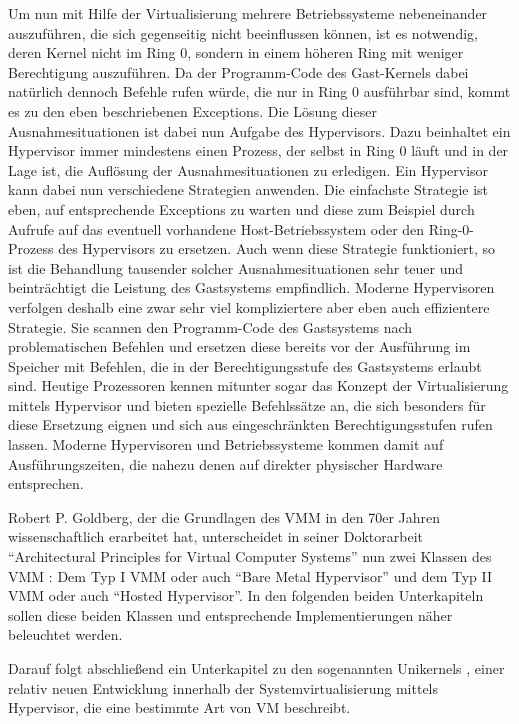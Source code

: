 Um nun mit Hilfe der Virtualisierung mehrere Betriebssysteme nebeneinander auszuführen, die sich gegenseitig nicht beeinflussen können, ist es notwendig, deren Kernel nicht im Ring 0, sondern in einem höheren Ring mit weniger Berechtigung auszuführen. Da der Programm-Code des Gast-Kernels dabei natürlich dennoch Befehle rufen würde, die nur in Ring 0 ausführbar sind, kommt es zu den eben beschriebenen Exceptions. Die Lösung dieser Ausnahmesituationen ist dabei nun Aufgabe des Hypervisors. Dazu beinhaltet ein Hypervisor immer mindestens einen Prozess, der selbst in Ring 0 läuft und in der Lage ist, die Auflösung der Ausnahmesituationen zu erledigen. Ein Hypervisor kann dabei nun verschiedene Strategien anwenden. Die einfachste Strategie ist eben, auf entsprechende Exceptions zu warten und diese zum Beispiel durch Aufrufe auf das eventuell vorhandene Host-Betriebssystem oder den Ring-0-Prozess des Hypervisors zu ersetzen. Auch wenn diese Strategie funktioniert, so ist die Behandlung tausender solcher Ausnahmesituationen sehr teuer und beinträchtigt die Leistung des Gastsystems empfindlich. Moderne Hypervisoren verfolgen deshalb eine zwar sehr viel kompliziertere aber eben auch effizientere Strategie. Sie scannen den Programm-Code des Gastsystems nach problematischen Befehlen und ersetzen diese bereits vor der Ausführung im Speicher mit Befehlen, die in der Berechtigungsstufe des Gastsystems erlaubt sind. Heutige Prozessoren kennen mitunter sogar das Konzept der Virtualisierung mittels Hypervisor und bieten spezielle Befehlssätze an, die sich besonders für diese Ersetzung eignen und sich aus eingeschränkten Berechtigungsstufen rufen lassen. Moderne Hypervisoren und Betriebssysteme kommen damit auf Ausführungszeiten, die nahezu denen auf direkter physischer Hardware entsprechen.

Robert P. Goldberg, der die Grundlagen des \ac{VMM} in den 70er Jahren wissenschaftlich erarbeitet hat, unterscheidet in seiner Doktorarbeit "`Architectural Principles for Virtual Computer Systems"' nun zwei Klassen des \ac{VMM} \citep[Vgl.][S. 22 ff.]{Goldberg73}: Dem Typ I \ac{VMM} oder auch "`Bare Metal Hypervisor"' und dem Typ II \ac{VMM} oder auch "`Hosted Hypervisor"'. In den folgenden beiden Unterkapiteln sollen diese beiden Klassen und entsprechende Implementierungen näher beleuchtet werden.

Darauf folgt abschließend ein Unterkapitel zu den sogenannten Unikernels \citep[Vgl.][Abstract und Introduction]{MadMorAnd13}, einer relativ neuen Entwicklung innerhalb der Systemvirtualisierung mittels Hypervisor, die eine bestimmte Art von \ac{VM} beschreibt.

